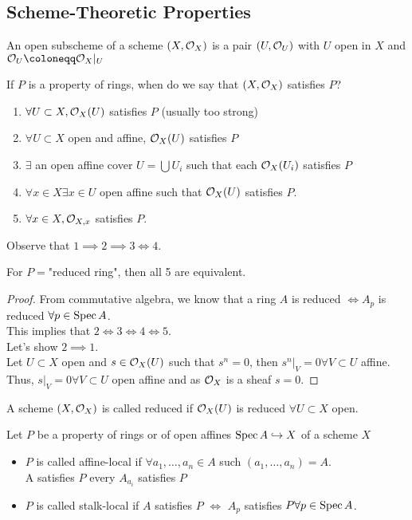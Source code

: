 \documentclass[../main.tex]{subfiles}
\begin{document}
\subsection{Scheme-Theoretic Properties}
\begin{defn}
	An open subscheme of a scheme $( X,\mathcal{O}_X) $ is a pair $( U, \mathcal{O}_U) $ with $U$ open in $X$ and $\O_U \coloneqq  \O_X|_U$ 
\end{defn}
If $P$ is a property of rings, when do we say that $( X,\mathcal{O}_X) $ satisfies $P$?\\
\begin{enumerate}
	\item $\forall U \subset X, \mathcal{O}_X( U) $ satisfies $P$ (usually too strong) 
	\item $\forall U \subset X$ open and affine, $\mathcal{O}_X( U) $ satisfies $P$ 
	\item $\exists$ an open affine cover $U = \bigcup U_i$ such that each $\mathcal{O}_X( U_i) $ satisfies $P$ 
	\item $\forall  x\in X\exists x \in U$ open affine such that $\mathcal{O}_X( U) $ satisfies $P$.
	\item $\forall x \in X, \mathcal{O}_{X,x} $ satisfies $P$.
\end{enumerate}
Observe that $1 \implies 2\implies 3 \iff 4$.\\
\begin{lemma}
For $P=$"reduced ring", then all 5 are equivalent.
\end{lemma}
\begin{proof}
From commutative algebra, we know that a ring $A$ is reduced $\iff A_p$ is reduced $\forall p \in \operatorname{Spec} A$.\\
This implies that $2\iff 3 \iff 4 \iff 5$.\\
Let's show $2 \implies 1$.\\
Let $U \subset X$ open and $s\in \mathcal{O}_X( U) $ such that $s^{n}=0$, then $s^{n}|_V = 0 \forall V \subset U$ affine.\\
Thus, $s|_V=0 \forall V \subset U$ open affine and as $\mathcal{O}_X$ is a sheaf $s=0$.
\end{proof}
\begin{defn}
	A scheme $( X,\mathcal{O}_X) $ is called reduced if $\mathcal{O}_X( U) $ is reduced $\forall U \subset X$ open.
\end{defn}
\begin{defn}
	Let $P$ be a property of rings or of open affines $\operatorname{Spec} A \hookrightarrow X$ of a scheme $X$ 
	\begin{itemize}
	\item $P$ is called affine-local if $\forall a_1,\ldots,a_n \in A$ such $( a_1,\ldots, a_n) = A$.\\
		A satisfies $P$ every $A_{a_i} $ satisfies $P$ 
	\item $P$ is called stalk-local if $A$ satisfies $P$ $\iff$ $A_p$ satisfies $P\forall p \in \operatorname{Spec} A$.
	\end{itemize}
\end{defn}
\end{document}
